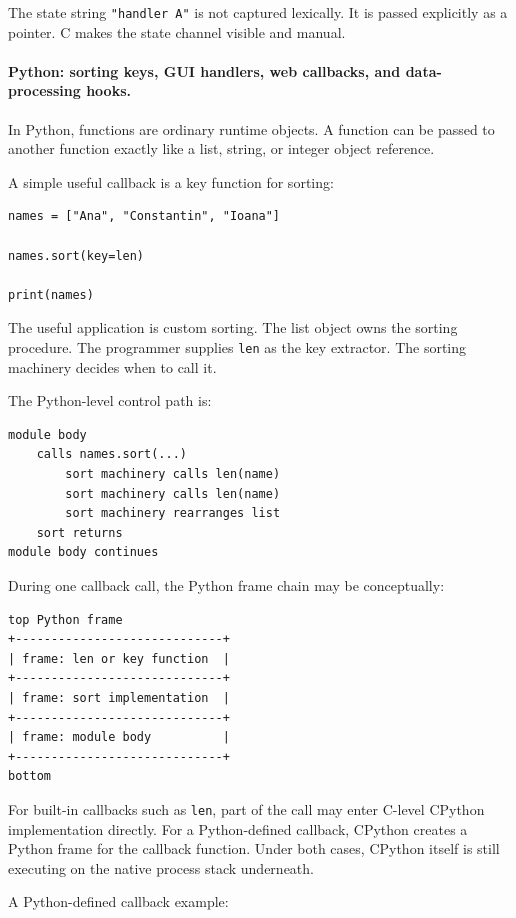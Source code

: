 The state string \texttt{"handler A"} is not captured lexically. It is passed explicitly as a pointer. C makes the state channel visible and manual.

\paragraph{Python: sorting keys, GUI handlers, web callbacks, and data-processing hooks.}

In Python, functions are ordinary runtime objects. A function can be passed to another function exactly like a list, string, or integer object reference.

A simple useful callback is a key function for sorting:

\begin{verbatim}
names = ["Ana", "Constantin", "Ioana"]

names.sort(key=len)

print(names)
\end{verbatim}

The useful application is custom sorting. The list object owns the sorting procedure. The programmer supplies \texttt{len} as the key extractor. The sorting machinery decides when to call it.

The Python-level control path is:

\begin{verbatim}
module body
    calls names.sort(...)
        sort machinery calls len(name)
        sort machinery calls len(name)
        sort machinery rearranges list
    sort returns
module body continues
\end{verbatim}

During one callback call, the Python frame chain may be conceptually:

\begin{verbatim}
top Python frame
+-----------------------------+
| frame: len or key function  |
+-----------------------------+
| frame: sort implementation  |
+-----------------------------+
| frame: module body          |
+-----------------------------+
bottom
\end{verbatim}

For built-in callbacks such as \texttt{len}, part of the call may enter C-level CPython implementation directly. For a Python-defined callback, CPython creates a Python frame for the callback function. Under both cases, CPython itself is still executing on the native process stack underneath.

A Python-defined callback example:

